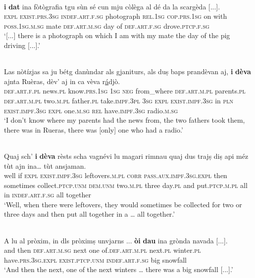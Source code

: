 \ea
\label{ex:exist.da2}
\\
\gll    [...] \textbf{i} \textbf{dat} ina fòtògrafia tgu sùn sé cun mju còlèga al dé da la scargèda [...].\\
{} \textsc{expl} \textsc{exist.prs.3sg}  \textsc{indef.art.f.sg} photograph \textsc{rel.1sg}  \textsc{cop.prs.1sg} on with \textsc{poss.1sg.m.sg} mate \textsc{def.art.m.sg} day of  \textsc{def.art.f.sg}  drove.\textsc{ptcp.f.sg}\\
\glt `[...] there is a photograph on which I am with my mate the day of the pig driving [...].'
\z

\ea
\label{ex:exist.da3}
\\
\gll    Las nòtízjas sa ju bétg danùndar als gjaniturs, als duṣ baps prandèvan aj, \textbf{i} \textbf{dèva} ajnta Ruèras, dèv’ aj in ca vèva r\underline{á}djò. \\
\textsc{def.art.f.pl} news.\textsc{pl} know.\textsc{prs.1sg} \textsc{1sg} \textsc{neg} from\_where \textsc{def.art.m.pl} parents.\textsc{pl} \textsc{def.art.m.pl} two.\textsc{m.pl} father.\textsc{pl} take.\textsc{impf.3pl} \textsc{3sg} \textsc{expl} \textsc{exist.impf.3sg} in \textsc{pln} \textsc{exist.impf.3sg} \textsc{expl}  one.\textsc{m.sg} \textsc{rel} have.\textsc{impf.3sg} radio.\textsc{m.sg}\\
\glt `I don’t know where my parents had the news from, the two fathers took them, there was in Rueras, there was [only] one who had a radio.'
\z

\ea
\label{ex:exist.da4}
\\
\gll  Quaj sch’ \textbf{i} \textbf{dèva} rèsts scha vagnévi lu magari rimnau quaj dus trajṣ diṣ api méz tùt ajn ina… tùt ansjaman.  \\
well if \textsc{expl} \textsc{exist.impf.3sg} leftovers.\textsc{m.pl} \textsc{corr} \textsc{pass.aux.impf.3sg.expl} then sometimes collect.\textsc{ptcp.unm} \textsc{dem.unm} two.\textsc{m.pl} three day.\textsc{pl} and put.\textsc{ptcp.m.pl} all in  \textsc{indef.art.f.sg} all together\\
\glt `Well, when there were leftovers, they would sometimes be collected for two or three days and then put all together in a … all together.'
\z

\ea
\label{ex:exist.da5}
\\
\gll    A lu al pròxim, in dls pròximṣ unvjarns ... \textbf{òi} \textbf{dau} ina grònda navada [...].\\
and then \textsc{def.art.m.sg} next one of.\textsc{def.art.m.pl} next.\textsc{pl} winter.\textsc{pl} {} have.\textsc{prs.3sg}.\textsc{expl} \textsc{exist.ptcp.unm} \textsc{indef.art.f.sg} big snowfall \\
\glt `And then the next, one of the next winters … there was a big snowfall [...].'
\z

